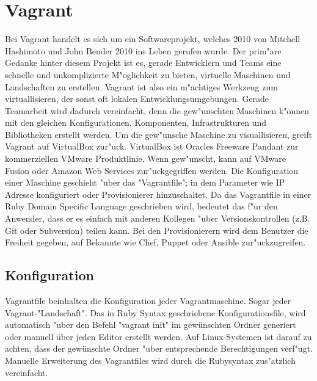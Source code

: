\section{Vagrant}
Bei Vagrant handelt es sich um ein Softwareprojekt, welches 2010 von Mitchell Hashimoto und John Bender 2010 ins Leben gerufen wurde.
Der prim"are Gedanke hinter diesem Projekt ist es, gerade Entwicklern und Teams eine schnelle und unkomplizierte M"oglichkeit zu bieten, virtuelle Maschinen und Landschaften zu erstellen.\newline
Vagrant ist also ein m"achtiges Werkzeug zum virtuallisieren, der sonst oft lokalen Entwicklungsumgebungen. 
Gerade Teamarbeit wird dadurch vereinfacht, denn die gew"unschten Maschinen k"onnen mit den gleichen Konfigurationen, Komponenten, Infrastrukturen und Bibliotheken erstellt werden.\newline 
Um die gew"unsche Maschine zu visuallisieren, greift Vagrant auf VirtualBox zur"uck.
VirtualBox ist Oracles Freeware Pandant zur kommerziellen VMware Produktlinie. Wenn gew"unscht, kann auf VMware Fusion oder Amazon Web Services zur"uckgegriffen werden.\newline 
Die Konfiguration einer Maschine geschieht "uber das "Vagrantfile"; in dem Parameter wie IP Adresse konfiguriert oder Provisionierer hinzuschaltet.
Da das Vagrantfile in einer Ruby Domain Specific Language geschrieben wird, bedeutet das f"ur den Anwender, dass er es einfach mit anderen Kollegen "uber Versionskontrollen (z.B. Git oder Subversion) teilen kann.
Bei den Provisionierern wird dem Benutzer die Freiheit gegeben, auf Bekannte wie Chef, Puppet oder Ansible zur"uckzugreifen.

\subsection{Konfiguration}
Vagrantfile beinhalten die Konfiguration jeder Vagrantmaschine. Sogar jeder Vagrant-"Landschaft". 
Das in Ruby Syntax geschriebene Konfigurationsfile, wird automatisch "uber den Befehl "vagrant init" im gewünschten Ordner generiert oder manuell über jeden Editor erstellt werden. Auf Linux-Systemen ist darauf zu achten, dass der gewünschte Ordner "uber entsprechende Berechtigungen verf"ugt.
Manuelle Erweiterung des Vagrantfiles wird durch die Rubysyntax zus"atzlich vereinfacht.


